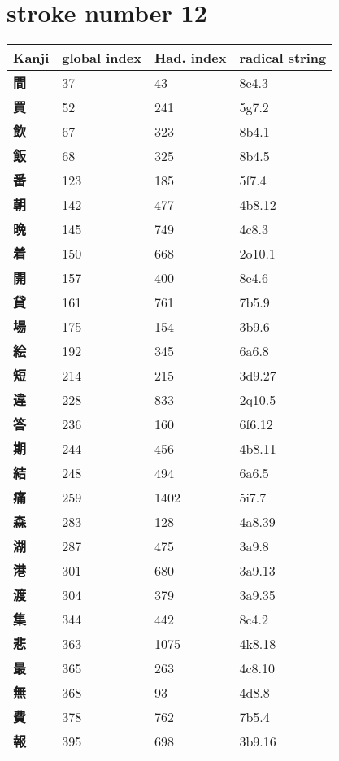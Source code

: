 \section{stroke number 12}
  \begin{longtable}[c]{llll}
    \bfseries Kanji & \bfseries global index & \bfseries Had. index & \bfseries radical string\\\hline\endhead
    \bfseries 間 & 37 & 43 & 8e4.3\\
    \bfseries 買 & 52 & 241 & 5g7.2\\
    \bfseries 飲 & 67 & 323 & 8b4.1\\
    \bfseries 飯 & 68 & 325 & 8b4.5\\
    \bfseries 番 & 123 & 185 & 5f7.4\\
    \bfseries 朝 & 142 & 477 & 4b8.12\\
    \bfseries 晩 & 145 & 749 & 4c8.3\\
    \bfseries 着 & 150 & 668 & 2o10.1\\
    \bfseries 開 & 157 & 400 & 8e4.6\\
    \bfseries 貸 & 161 & 761 & 7b5.9\\
    \bfseries 場 & 175 & 154 & 3b9.6\\
    \bfseries 絵 & 192 & 345 & 6a6.8\\
    \bfseries 短 & 214 & 215 & 3d9.27\\
    \bfseries 違 & 228 & 833 & 2q10.5\\
    \bfseries 答 & 236 & 160 & 6f6.12\\
    \bfseries 期 & 244 & 456 & 4b8.11\\
    \bfseries 結 & 248 & 494 & 6a6.5\\
    \bfseries 痛 & 259 & 1402 & 5i7.7\\
    \bfseries 森 & 283 & 128 & 4a8.39\\
    \bfseries 湖 & 287 & 475 & 3a9.8\\
    \bfseries 港 & 301 & 680 & 3a9.13\\
    \bfseries 渡 & 304 & 379 & 3a9.35\\
    \bfseries 集 & 344 & 442 & 8c4.2\\
    \bfseries 悲 & 363 & 1075 & 4k8.18\\
    \bfseries 最 & 365 & 263 & 4c8.10\\
    \bfseries 無 & 368 & 93 & 4d8.8\\
    \bfseries 費 & 378 & 762 & 7b5.4\\
    \bfseries 報 & 395 & 698 & 3b9.16\\

\end{longtable}
